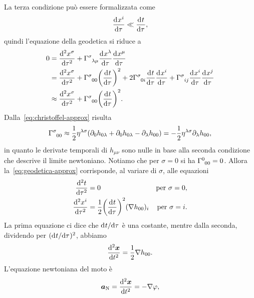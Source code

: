 La terza condizione può essere formalizzata come
\begin{equation}
  \toder{x^{i}}{\tau} \ll \toder{t}{\tau},
\end{equation}
quindi l'equazione della geodetica si riduce a
\begin{equation}
  \label{eq:geodetica-approx}
  \begin{split}
    0 &= \toder[2]{x^{\sigma}}{\tau} + \tensor{\Gamma}{^{\sigma}_{\lambda\mu}}
    \toder{x^{\lambda}}{\tau} \toder{x^{\mu}}{\tau} \\
    &= \toder[2]{x^{\sigma}}{\tau} + \tensor{\Gamma}{^{\sigma}_{00}} \bigg(
    \toder{t}{\tau} \bigg)^{2} + 2\tensor{\Gamma}{^{\sigma}_{0i}}\toder{t}{\tau}
    \toder{x^{i}}{\tau} + \tensor{\Gamma}{^{\sigma}_{ij}} \toder{x^{i}}{\tau}
    \toder{x^{j}}{\tau} \\
    &\approx \toder[2]{x^{\sigma}}{\tau} + \tensor{\Gamma}{^{\sigma}_{00}}\bigg(
    \toder{t}{\tau} \bigg)^{2}.
  \end{split}
\end{equation}
Dalla~\eqref{eq:christoffel-approx} risulta
\begin{equation}
  \tensor{\Gamma}{^{\sigma}_{00}} \approx
  \frac{1}{2}\eta^{\lambda\sigma}(\partial_{0}h_{0\lambda}
  + \partial_{0}h_{0\lambda} - \partial_{\lambda}h_{00}) =
  -\frac{1}{2}\eta^{\lambda\sigma} \partial_{\lambda}h_{00},
\end{equation}
in quanto le derivate temporali di $h_{\mu\nu}$ sono nulle in base alla seconda
condizione che descrive il limite newtoniano.  Notiamo che per $\sigma=0$ si ha
$\tensor{\Gamma}{^{0}_{00}}=0$.  Allora la~\eqref{eq:geodetica-approx}
corrisponde, al variare di $\sigma$, alle equazioni
\begin{subequations}
  \begin{align}
    \toder[2]{t}{\tau} &= 0 &\text{per $\sigma = 0$}, \\
    \toder[2]{x^{i}}{\tau} &= \frac{1}{2} \bigg( \toder{t}{\tau} \bigg)^{2}
    (\nabla h_{00})_{i} &\text{per $\sigma = i$}.
  \end{align}
\end{subequations}
La prima equazione ci dice che $\ltoder{t}{\tau}$ è una costante, mentre dalla
seconda, dividendo per $(\ltoder{t}{\tau})^{2}$, abbiamo
\begin{equation}
  \toder[2]{\bm{x}}{t} = \frac{1}{2}\nabla h_{00}.
\end{equation}
L'equazione newtoniana del moto è
\begin{equation}
  \bm{a}_{\textup{N}} = \toder[2]{\bm{x}}{t} = -\nabla\phi,
\end{equation}
